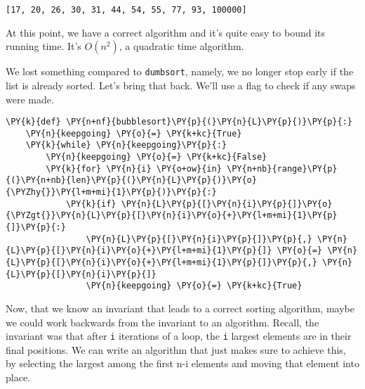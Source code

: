\begin{Verbatim}
[17, 20, 26, 30, 31, 44, 54, 55, 77, 93, 100000]

\end{Verbatim}


At this point, we have a correct algorithm and it's quite easy to bound its running time.  It's $O(n^2)$, a quadratic time algorithm.


We lost something compared to \texttt{dumbsort}, namely, we no longer stop early if the list is already sorted.  Let's bring that back.  We'll use a flag to check if any swaps were made.  

\begin{Verbatim}[commandchars=\\\{\}]
\PY{k}{def} \PY{n+nf}{bubblesort}\PY{p}{(}\PY{n}{L}\PY{p}{)}\PY{p}{:}
    \PY{n}{keepgoing} \PY{o}{=} \PY{k+kc}{True}
    \PY{k}{while} \PY{n}{keepgoing}\PY{p}{:}
        \PY{n}{keepgoing} \PY{o}{=} \PY{k+kc}{False}
        \PY{k}{for} \PY{n}{i} \PY{o+ow}{in} \PY{n+nb}{range}\PY{p}{(}\PY{n+nb}{len}\PY{p}{(}\PY{n}{L}\PY{p}{)}\PY{o}{\PYZhy{}}\PY{l+m+mi}{1}\PY{p}{)}\PY{p}{:}
            \PY{k}{if} \PY{n}{L}\PY{p}{[}\PY{n}{i}\PY{p}{]}\PY{o}{\PYZgt{}}\PY{n}{L}\PY{p}{[}\PY{n}{i}\PY{o}{+}\PY{l+m+mi}{1}\PY{p}{]}\PY{p}{:}
                \PY{n}{L}\PY{p}{[}\PY{n}{i}\PY{p}{]}\PY{p}{,} \PY{n}{L}\PY{p}{[}\PY{n}{i}\PY{o}{+}\PY{l+m+mi}{1}\PY{p}{]} \PY{o}{=} \PY{n}{L}\PY{p}{[}\PY{n}{i}\PY{o}{+}\PY{l+m+mi}{1}\PY{p}{]}\PY{p}{,} \PY{n}{L}\PY{p}{[}\PY{n}{i}\PY{p}{]}
                \PY{n}{keepgoing} \PY{o}{=} \PY{k+kc}{True}
\end{Verbatim}



Now, that we know an invariant that leads to a correct sorting algorithm, maybe we could work backwards from the invariant to an algorithm.  Recall, the invariant was that after \texttt{i} iterations of a loop, the \texttt{i} largest elements are in their final positions.  We can write an algorithm that just makes sure to achieve this, by selecting the largest among the first n-i elements and moving that element into place.

